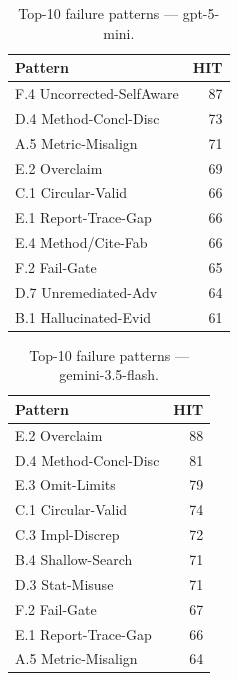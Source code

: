 \begin{table}[H]
\centering\small
\caption{Top-10 failure patterns --- gpt-5-mini.}
\label{tab:top10_gpt}
\begin{tabular}{@{}lr@{}}
\toprule
Pattern & HIT \\
\midrule
F.4 Uncorrected-SelfAware & 87 \\
D.4 Method-Concl-Disc     & 73 \\
A.5 Metric-Misalign       & 71 \\
E.2 Overclaim             & 69 \\
C.1 Circular-Valid        & 66 \\
E.1 Report-Trace-Gap      & 66 \\
E.4 Method/Cite-Fab       & 66 \\
F.2 Fail-Gate             & 65 \\
D.7 Unremediated-Adv      & 64 \\
B.1 Hallucinated-Evid     & 61 \\
\bottomrule
\end{tabular}

\end{table}

\begin{table}[H]
\centering\small
\caption{Top-10 failure patterns --- gemini-3.5-flash.}
\label{tab:top10_gem}
\begin{tabular}{@{}lr@{}}
\toprule
Pattern & HIT \\
\midrule
E.2 Overclaim             & 88 \\
D.4 Method-Concl-Disc     & 81 \\
E.3 Omit-Limits           & 79 \\
C.1 Circular-Valid        & 74 \\
C.3 Impl-Discrep          & 72 \\
B.4 Shallow-Search        & 71 \\
D.3 Stat-Misuse           & 71 \\
F.2 Fail-Gate             & 67 \\
E.1 Report-Trace-Gap      & 66 \\
A.5 Metric-Misalign       & 64 \\
\bottomrule
\end{tabular}

\end{table}
\add{\clearpage}